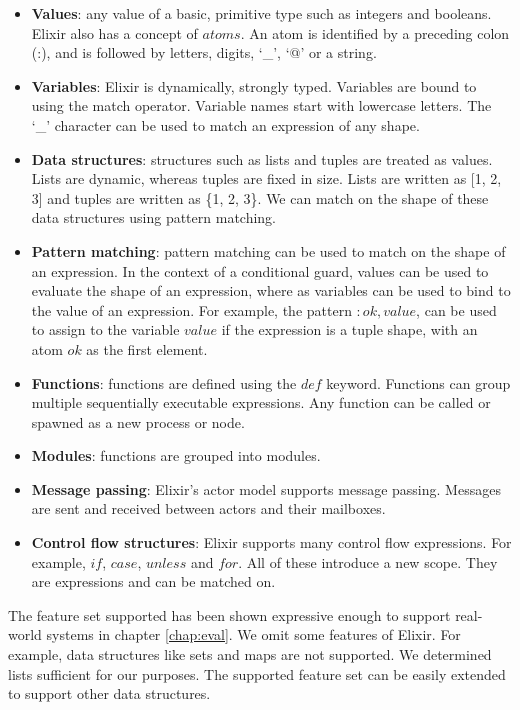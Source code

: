 \begin{itemize}
    \item \textbf{Values}: any value of a basic, primitive type such as integers and booleans. Elixir also has a concept of $atoms$. An atom is identified by a preceding colon (:), and is followed by letters, digits, `\_', `@' or a string.
    \item \textbf{Variables}: Elixir is dynamically, strongly typed. Variables are bound to using the match operator. Variable names start with lowercase letters. The `\_' character can be used to match an expression of any shape.
    \item \textbf{Data structures}: structures such as lists and tuples are treated as values. Lists are dynamic, whereas tuples are fixed in size. Lists are written as [1, 2, 3] and tuples are written as \{1, 2, 3\}. We can match on the shape of these data structures using pattern matching.
    \item \textbf{Pattern matching}: pattern matching can be used to match on the shape of an expression. In the context of a conditional guard, values can be used to evaluate the shape of an expression, where as variables can be used to bind to the value of an expression. For example, the pattern ${:ok, value}$, can be used to assign to the variable $value$ if the expression is a tuple shape, with an atom $ok$ as the first element.
    \item \textbf{Functions}: functions are defined using the $def$ keyword. Functions can group multiple sequentially executable expressions. Any function can be called or spawned as a new process or node.
    \item \textbf{Modules}: functions are grouped into modules.
    \item \textbf{Message passing}: Elixir's actor model supports message passing. Messages are sent and received between actors and their mailboxes.
    \item \textbf{Control flow structures}: Elixir supports many control flow expressions. For example, $if$, $case$, $unless$ and $for$. All of these introduce a new scope. They are expressions and can be matched on.
\end{itemize}
The feature set supported has been shown expressive enough to support real-world systems in chapter \ref{chap:eval}. We omit some features of Elixir. For example, data structures like sets and maps are not supported. We determined lists sufficient for our purposes. The supported feature set can be easily extended to support other data structures.
